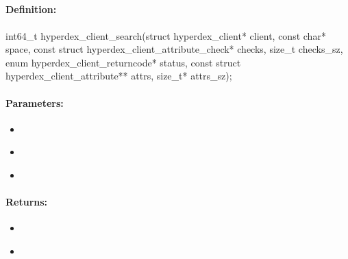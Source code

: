 \pagebreak
\subsection{}
\label{api:c:search}


\paragraph{Definition:}
\begin{ccode}
int64_t hyperdex_client_search(struct hyperdex_client* client,
        const char* space,
        const struct hyperdex_client_attribute_check* checks, size_t checks_sz,
        enum hyperdex_client_returncode* status,
        const struct hyperdex_client_attribute** attrs, size_t* attrs_sz);
\end{ccode}

\paragraph{Parameters:}
\begin{itemize}[noitemsep]
\item {}\\

\item {}\\

\item {}\\

\end{itemize}

\paragraph{Returns:}
\begin{itemize}[noitemsep]
\item {}\\

\item {}\\

\end{itemize}

